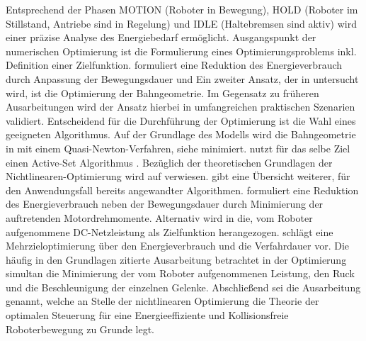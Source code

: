 Entsprechend der Phasen MOTION (Roboter in Bewegung), HOLD (Roboter im Stillstand, Antriebe sind in Regelung) und IDLE (Haltebremsen sind aktiv) wird einer präzise Analyse des Energiebedarf ermöglicht\cite{Ziaukas.2017}. 
%
Ausgangspunkt der numerischen Optimierung ist die Formulierung eines Optimierungsproblems inkl. Definition einer Zielfunktion.  
\cite{Ziaukas.2017} formuliert eine  Reduktion des Energieverbrauch durch Anpassung der Bewegungsdauer und 
%
Ein zweiter Ansatz, der in \cite{Eggers.2019} untersucht wird, ist die Optimierung der Bahngeometrie.  Im Gegensatz zu früheren Ausarbeitungen wird der Ansatz hierbei in umfangreichen praktischen Szenarien validiert. 
Entscheidend für die Durchführung der Optimierung ist die Wahl eines geeigneten Algorithmus.%
%
%
Auf der Grundlage des Modells wird die Bahngeometrie in \Cite{Hansen.2012} mit einem Quasi-Newton-Verfahren, siehe \cite[S.~49]{Papageorgiou.2015} minimiert. \cite{Ziaukas.2017} nutzt für das selbe Ziel einen Active-Set Algorithmus \cite[S.~445]{Luenberger.2021}. Bezüglich der theoretischen Grundlagen der Nichtlinearen-Optimierung wird auf \cite{Nocedal.2006} verwiesen. \cite[S.10~ff.]{Carabin.2017} gibt eine Übersicht weiterer, für den Anwendungsfall bereits angewandter Algorithmen.\cite{Ziaukas.2017} formuliert eine Reduktion des Energieverbrauch neben der Bewegungsdauer durch Minimierung der auftretenden Motordrehmomente. Alternativ wird in \cite{Hansen.2012} die, vom Roboter aufgenommene DC-Netzleistung als Zielfunktion herangezogen.\cite{Lin.2018} schlägt eine Mehrzieloptimierung über den  Energieverbrauch und die Verfahrdauer vor. Die häufig in den Grundlagen zitierte Ausarbeitung \cite{Saravanan.2008} betrachtet in der Optimierung simultan die Minimierung der vom Roboter aufgenommenen Leistung, den Ruck  und die Beschleunigung der einzelnen Gelenke. Abschließend sei die Ausarbeitung  \cite{Bjorkenstam.2013} genannt, welche an Stelle der nichtlinearen Optimierung die Theorie der optimalen Steuerung für eine Energieeffiziente und Kollisionsfreie Roboterbewegung zu Grunde legt.
%
%
